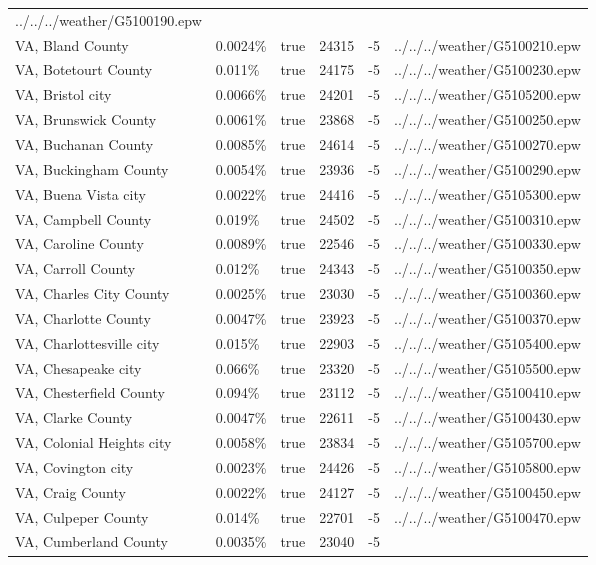 \begin{longtable}[]{@{}llllll@{}}
../../../weather/G5100190.epw \\
VA, Bland County & 0.0024\% & true & 24315 & -5 &
../../../weather/G5100210.epw \\
VA, Botetourt County & 0.011\% & true & 24175 & -5 &
../../../weather/G5100230.epw \\
VA, Bristol city & 0.0066\% & true & 24201 & -5 &
../../../weather/G5105200.epw \\
VA, Brunswick County & 0.0061\% & true & 23868 & -5 &
../../../weather/G5100250.epw \\
VA, Buchanan County & 0.0085\% & true & 24614 & -5 &
../../../weather/G5100270.epw \\
VA, Buckingham County & 0.0054\% & true & 23936 & -5 &
../../../weather/G5100290.epw \\
VA, Buena Vista city & 0.0022\% & true & 24416 & -5 &
../../../weather/G5105300.epw \\
VA, Campbell County & 0.019\% & true & 24502 & -5 &
../../../weather/G5100310.epw \\
VA, Caroline County & 0.0089\% & true & 22546 & -5 &
../../../weather/G5100330.epw \\
VA, Carroll County & 0.012\% & true & 24343 & -5 &
../../../weather/G5100350.epw \\
VA, Charles City County & 0.0025\% & true & 23030 & -5 &
../../../weather/G5100360.epw \\
VA, Charlotte County & 0.0047\% & true & 23923 & -5 &
../../../weather/G5100370.epw \\
VA, Charlottesville city & 0.015\% & true & 22903 & -5 &
../../../weather/G5105400.epw \\
VA, Chesapeake city & 0.066\% & true & 23320 & -5 &
../../../weather/G5105500.epw \\
VA, Chesterfield County & 0.094\% & true & 23112 & -5 &
../../../weather/G5100410.epw \\
VA, Clarke County & 0.0047\% & true & 22611 & -5 &
../../../weather/G5100430.epw \\
VA, Colonial Heights city & 0.0058\% & true & 23834 & -5 &
../../../weather/G5105700.epw \\
VA, Covington city & 0.0023\% & true & 24426 & -5 &
../../../weather/G5105800.epw \\
VA, Craig County & 0.0022\% & true & 24127 & -5 &
../../../weather/G5100450.epw \\
VA, Culpeper County & 0.014\% & true & 22701 & -5 &
../../../weather/G5100470.epw \\
VA, Cumberland County & 0.0035\% & true & 23040 & -5 &

\end{longtable}
